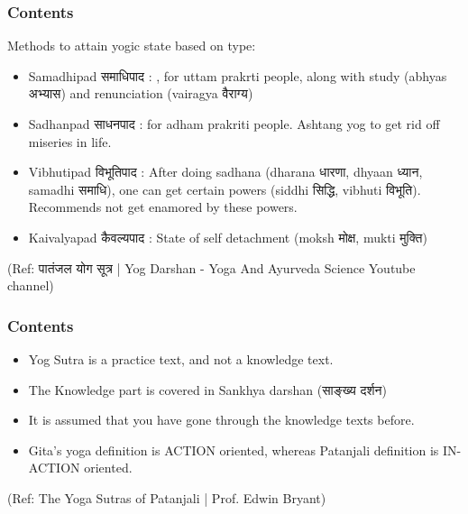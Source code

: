 \begin{frame}[fragile]\frametitle{Contents}

Methods to attain yogic state based on type:


	\begin{itemize}
	\item Samadhipad समाधिपाद : , for uttam prakrti people, along with study (abhyas अभ्यास) and renunciation (vairagya वैराग्य)
	\item Sadhanpad साधनपाद : for adham prakriti people. Ashtang yog to get rid off miseries in life.
	\item Vibhutipad विभूतिपाद : After doing sadhana (dharana धारणा, dhyaan ध्यान, samadhi समाधि), one can get certain powers (siddhi सिद्धि, vibhuti विभूति). Recommends not get enamored by these powers.
	\item Kaivalyapad कैवल्यपाद : State of self detachment (moksh मोक्ष, mukti मुक्ति)
	\end{itemize}	

\tiny{(Ref: पातंजल योग सूत्र | Yog Darshan - Yoga And Ayurveda Science Youtube channel)}

\end{frame}


\begin{frame}[fragile]\frametitle{Contents}
	\begin{itemize}
	\item Yog Sutra is a practice text, and not a knowledge text.
	\item The Knowledge part is covered in Sankhya darshan (साङ्ख्य दर्शन)
	\item It is assumed that you have gone through the knowledge texts before.
	\item Gita's yoga definition is ACTION oriented, whereas Patanjali definition is IN-ACTION oriented.
	\end{itemize}

\tiny{(Ref: The Yoga Sutras of Patanjali | Prof. Edwin Bryant)}

\end{frame}
